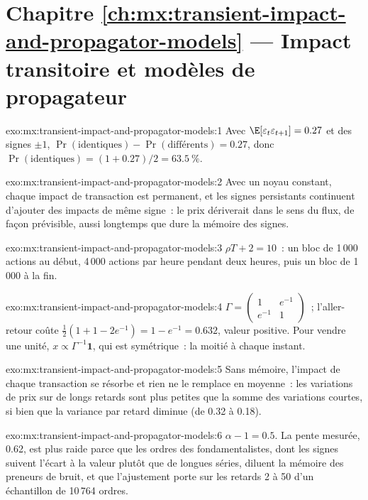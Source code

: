 \section*{Chapitre \ref{ch:mx:transient-impact-and-propagator-models} --- Impact transitoire et modèles de propagateur}

\begin{solution}{exo:mx:transient-impact-and-propagator-models:1}
Avec $\E[\varepsilon_t\varepsilon_{t+1}]=0.27$ et des signes $\pm1$, $\Pr(\text{identiques})-\Pr(\text{différents})=0.27$, donc $\Pr(\text{identiques})=(1+0.27)/2=63.5~\%$.
\end{solution}

\begin{solution}{exo:mx:transient-impact-and-propagator-models:2}
Avec un noyau constant, chaque impact de transaction est permanent, et les signes persistants continuent d'ajouter des impacts de même signe~: le prix dériverait dans le sens du flux,
de façon prévisible, aussi longtemps que dure la mémoire des signes.
\end{solution}

\begin{solution}{exo:mx:transient-impact-and-propagator-models:3}
$\rho T+2=10$~: un bloc de 1\,000 actions au début, 4\,000 actions par heure pendant deux heures, puis un bloc de 1\,000 à la fin.
\end{solution}

\begin{solution}{exo:mx:transient-impact-and-propagator-models:4}
$\Gamma=\begin{pmatrix}1&e^{-1}\\e^{-1}&1\end{pmatrix}$~; l'aller-retour coûte $\tfrac12(1+1-2e^{-1})=1-e^{-1}=0.632$, valeur positive. Pour vendre une unité,
$x\propto\Gamma^{-1}\mathbf 1$, qui est symétrique~: la moitié à chaque instant.
\end{solution}

\begin{solution}{exo:mx:transient-impact-and-propagator-models:5}
Sans mémoire, l'impact de chaque transaction se résorbe et rien ne le remplace en moyenne~: les variations de prix sur de longs retards sont plus petites que la somme des variations courtes, si bien que
la variance par retard diminue (de 0.32 à 0.18).
\end{solution}

\begin{solution}{exo:mx:transient-impact-and-propagator-models:6}
$\alpha-1=0.5$. La pente mesurée, 0.62, est plus raide parce que les ordres des fondamentalistes, dont les signes suivent l'écart à la valeur plutôt que de longues séries, diluent
la mémoire des preneurs de bruit, et que l'ajustement porte sur les retards 2 à 50 d'un échantillon de 10\,764 ordres.
\end{solution}

